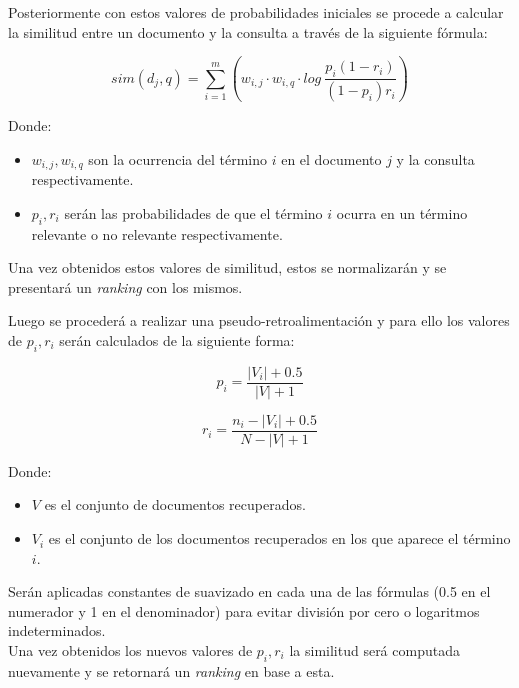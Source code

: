 \documentclass[spanish]{article}
\begin{document}
			Posteriormente con estos valores de probabilidades iniciales se procede a calcular la similitud entre un documento y la consulta a través de la siguiente fórmula:
	
			\begin{equation}
				\displaystyle sim(d_j,q) = \sum_{i=1}^m \left( w_{i,j} \cdot w_{i,q} \cdot log \ \frac{p_i (1 - r_i)}{(1- p_i ) r_i} \right)
			\end{equation}

			Donde:
			\begin{itemize}
				\item $ w_{i,j}, w_{i,q} $ son la ocurrencia del término $ i $ en el documento $ j $ y la consulta respectivamente.

				\item $ p_i, r_i $ serán las probabilidades de que el término $ i $ ocurra en un término relevante o no relevante respectivamente.
			\end{itemize}

			Una vez obtenidos estos valores de similitud, estos se normalizarán y se presentará un \emph{ranking} con los mismos. 

			Luego se procederá a realizar una pseudo-retroalimentación y para ello los valores de $ p_i, r_i $ serán calculados de la siguiente forma:

			\begin{equation}
				p_i = \frac{|V_i| + 0.5}{|V| + 1}
			\end{equation}
			
			\begin{equation}
				\displaystyle r_i = \frac{n_i - |V_i| + 0.5}{N - |V| + 1}
			\end{equation}
			
			Donde:

			\begin{itemize}
				\item $ V $ es el conjunto de documentos recuperados.
				\item $ V_i $ es el conjunto de los documentos recuperados en los que aparece el término $ i $.
			\end{itemize}

			Serán aplicadas constantes de suavizado en cada una de las fórmulas (0.5 en el numerador y 1 en el denominador) para evitar división por cero o logaritmos indeterminados.\\
			
			Una vez obtenidos los nuevos valores de $ p_i, r_i $ la similitud será computada nuevamente y se retornará un \emph{ranking} en base a esta.\\
\end{document}
